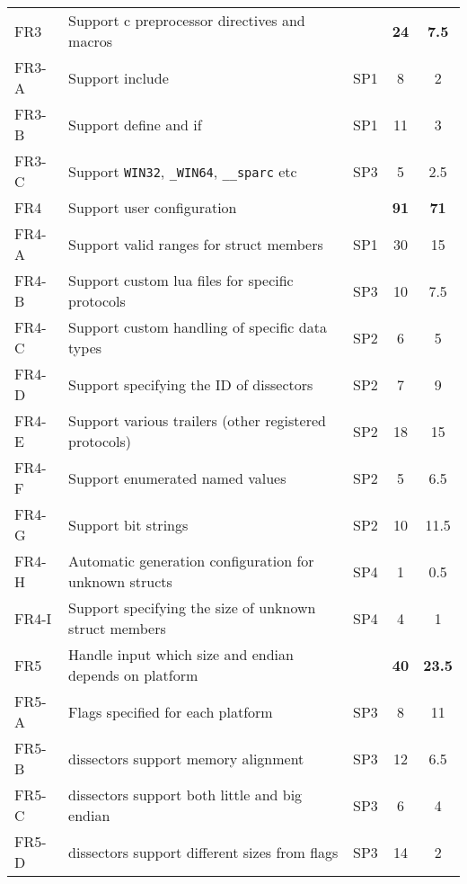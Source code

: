 \begin{table}[ht]
\begin{tabularx}{\textwidth}{l X c c c}
    \addlinespace
	FR3 & Support \Gls{c} \gls{preprocessor} directives and macros & & \textbf{24} &  \textbf{7.5}\\
	FR3-A & Support \gls{include} & SP1 & 8 & 2 \\
	FR3-B & Support \gls{define} and \gls{if} & SP1 & 11 & 3 \\
	FR3-C & Support \verb+WIN32+, \verb+_WIN64+, \verb+__sparc+ etc & SP3 & 5 & 2.5 \\
	\addlinespace
	FR4 & Support user configuration & & \textbf{91} & \textbf{71}\\
	FR4-A & Support valid ranges for \gls{struct} \glspl{member} & SP1 & 30 & 15 \\
	FR4-B & Support custom \Gls{lua} files for specific protocols & SP3 & 10 & 7.5 \\
	FR4-C & Support custom handling of specific data types & SP2 & 6 & 5 \\
	FR4-D & Support specifying the ID of \glspl{dissector} & SP2 & 7 & 9 \\
	FR4-E & Support various \gls{trailers} (other registered protocols) & SP2 & 18 & 15 \\
	FR4-F & Support \glspl{enumerated named value} & SP2 & 5 & 6.5 \\
	FR4-G & Support bit strings & SP2 & 10 & 11.5 \\
	FR4-H & Automatic generation configuration for unknown structs & SP4 & 1 & 0.5\\
	FR4-I & Support specifying the size of unknown struct members & SP4 & 4 & 1\\
	\addlinespace
	FR5 & Handle input which size and \gls{endian} depends on platform & & \textbf{40} & \textbf{23.5} \\
	FR5-A & Flags specified for each platform & SP3 & 8 & 11 \\
	FR5-B & \Glspl{dissector} support memory alignment & SP3 & 12 & 6.5 \\
	FR5-C & \Glspl{dissector} support both little and big \gls{endian} & SP3 & 6 & 4 \\
	FR5-D & \Glspl{dissector} support different sizes from flags & SP3 & 14 & 2 \\	
    \bottomrule
\end{tabularx}
\end{table}	
	
